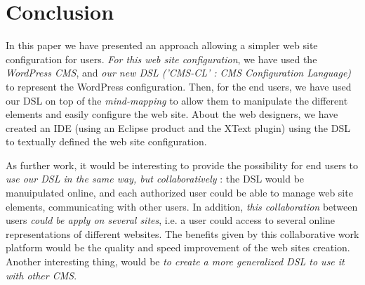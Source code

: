 \section{Conclusion}
In this paper we have presented an approach allowing a simpler web site configuration for users. \textit{For this web site configuration}, we have used the \textit{WordPress CMS}, and \textit{our new DSL ('CMS-CL' : CMS Configuration Language)} to represent the WordPress configuration. Then, for the end users, we have used our DSL on top of the \textit{mind-mapping} to allow them to manipulate the different elements and easily configure the web site. About the web designers, we have created an IDE (using an Eclipse product and the XText plugin) using the DSL to textually defined the web site configuration.

As further work, it would be interesting to provide the possibility for end users to \textit{use our DSL in the same way, but collaboratively} : the DSL would be manuipulated online, and each authorized user could be able to manage web site elements, communicating with other users. In addition, \textit{this collaboration} between users \textit{could be apply on several sites}, i.e. a user could access to several online representations of different websites. The benefits given by this collaborative work platform would be the quality and speed improvement of the web sites creation. Another interesting thing, would be \textit{to create a more generalized DSL to use it with other CMS}.